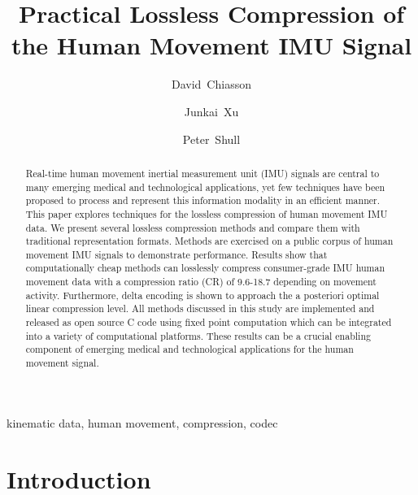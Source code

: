 \documentclass[journal]{IEEEtran}
\begin{document}
\title{Practical Lossless Compression of the Human Movement IMU Signal}

\author[1]{David~Chiasson}
\author[1]{Junkai~Xu}
\author[1]{Peter~Shull}

\maketitle

\begin{abstract}
Real-time human movement inertial measurement unit (IMU) signals are central to many emerging medical and technological applications, yet few techniques have been proposed to process and represent this information modality in an efficient manner. This paper explores techniques for the lossless compression of human movement IMU data. We present several lossless compression methods and compare them with traditional representation formats. Methods are exercised on a public corpus of human movement IMU signals to demonstrate performance. Results show that computationally cheap methods can losslessly compress consumer-grade IMU human movement data with a compression ratio (CR) of 9.6-18.7 depending on movement activity. Furthermore, delta encoding is shown to approach the a posteriori optimal linear compression level. All methods discussed in this study are implemented and released as open source C code using fixed point computation which can be integrated into a variety of computational platforms. These results can be a crucial enabling component of emerging medical and technological applications for the human movement signal.
\end{abstract}

\begin{IEEEkeywords}
kinematic data, human movement, compression, codec
\end{IEEEkeywords}



\section{Introduction}
\end{document}
